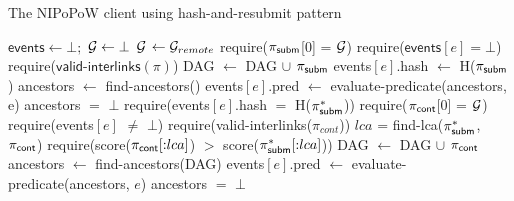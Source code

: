\begin{algorithm}

    \caption{\label{alg:har-nipopow}The \textsf{NIPoPoW} client using hash-and-resubmit pattern}
    \begin{algorithmic}[1]

    \State $\textsf{events} \gets \bot;$ $\mathcal{G} \gets \bot$
        \State $\mathcal{G}$ $\gets \mathcal{G}_{remote}$
    \EndFunction
        \State \textsf{require}($\mathsf{\pi_{subm}}$[0] = $\mathcal{G}$)
        \State \textsf{require}($\textsf{events$[e]$} = \bot$)
        \State \textsf{require}($\textsf{valid-interlinks}(\pi)$)
        \State \textsf{DAG} $\gets$ \textsf{DAG} $\cup$ $\mathsf{\pi_{subm}}$
        \State \textsf{events$[e]$.hash} $\gets$ \textsf{H}($\mathsf{\pi_{subm}}$)
        \State \textsf{ancestors} $\gets$ \textsf{find-ancestors()}
        \State \textsf{events$[e]$.pred} $\gets$
            \textsf{evaluate-predicate}(\textsf{ancestors}, e)
        \State \textsf{ancestors} $=$ $\bot$
    \EndFunction
        \State \textsf{require}(\textsf{events$[e]$.hash} $=$ \textsf{H}($\mathsf{\pi_{subm}^*}$))
        \State \textsf{require}($\mathsf{\pi_{cont}}$[0] = $\mathcal{G}$)
        \State \textsf{require}(\textsf{events}$[e]$ $\ne$ $\bot$)
        \State \textsf{require}(\textsf{valid-interlinks}($\pi_{cont}$))
        \State $lca$ = \textsf{find-lca}($\mathsf{\pi_{subm}^*}$, $\mathsf{\pi_{cont}}$)
        \State \textsf{require}(\textsf{score}($\mathsf{\pi_{cont}}[{:}lca]$)
        $>$ \textsf{score}($\mathsf{\pi_{subm}^*}[{:}lca]$))
        \State \textsf{DAG} $\gets$ \textsf{DAG} $\cup$ $\mathsf{\pi_{cont}}$
        \State \textsf{ancestors} $\gets$ \textsf{find-ancestors}(\textsf{DAG})
        \State \textsf{events$[e]$.pred} $\gets$
            \textsf{evaluate-predicate}(\textsf{ancestors}, $e$)
        \State \textsf{ancestors} $=$ $\bot$
    \EndFunction
    \EndContract
    \vskip8pt
    \end{algorithmic}
\end{algorithm}

